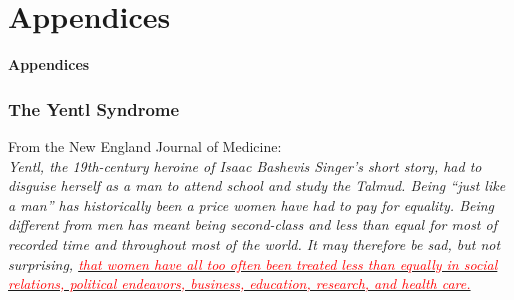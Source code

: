 \documentclass[9pt,letterpaper,subeqn]{beamer}
\begin{document}
\setcounter{table}{0}
\renewcommand{\thetable}{A\arabic{table}}
\setcounter{figure}{0}
\renewcommand{\thefigure}{A\arabic{figure}}

\section{Appendices}

\begin{frame}[plain]
\begin{center}
\textbf{Appendices}
\end{center}
\end{frame}


\begin{frame}[label=Yentl]
\frametitle{The Yentl Syndrome}
From the New England Journal of Medicine: \\
\vspace{4mm}
\textit{Yentl, the 19th-century heroine of Isaac Bashevis Singer's short story, 
had to disguise herself as a man to attend school and study the Talmud. Being 
``just like a man'' has historically been a price women have had to pay for 
equality. Being different from men has meant being second-class and less than 
equal for most of recorded time and throughout most of the world. It may therefore 
be sad, but not surprising, \hyperlink{intro}{\textcolor{red}{that women have all 
too often been treated less than equally in social relations, political endeavors, 
business, education, research, and health care.}}}\\
\end{frame}
\end{document}
